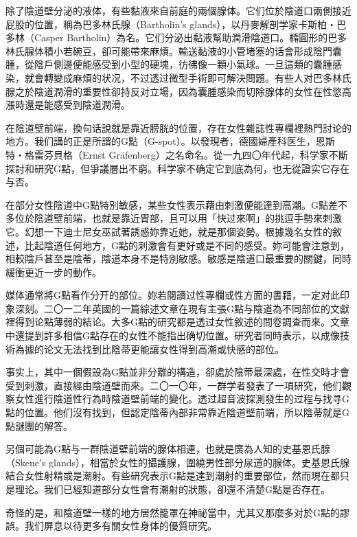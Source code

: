 \documentclass[12pt,UTF8]{ctexbook}
\begin{document}
除了陰道壁分泌的液体，有些黏液來自前庭的兩個腺体。它们位於陰道口兩側接近屁股的位置，稱為巴多林氏腺（Bartholin’s glands），以丹麥解剖学家卡斯柏‧巴多林（Casper Bartholin）為名。它们分泌出黏液幫助潤滑陰道口。橢圓形的巴多林氏腺体積小若碗豆，卻可能帶來麻煩。輸送黏液的小管堵塞的话會形成陰門囊腫，從陰戶側邊便能感受到小型的硬塊，彷彿像一顆小氣球。一旦這類的囊腫感染，就會轉變成麻煩的状况，不过透过微型手術即可解決問題。有些人对巴多林氏腺之於陰道潤滑的重要性卻持反对立場，因為囊腫感染而切除腺体的女性在性慾高漲時還是能感受到陰道潤滑。

在陰道壁前端，換句话說就是靠近膀胱的位置，存在女性雜誌性專欄裡熱門討论的地方。我们講的正是所謂的G點（G-spot）。以發現者，德國婦產科医生，恩斯特‧格雷芬貝格（Ernst Gräfenberg）之名命名。從一九四〇年代起，科学家不斷探討和研究G點，但爭議層出不窮。科学家不确定它到底為何，也无從證实它存在与否。

在部分女性陰道中G點特別敏感，某些女性表示藉由刺激便能達到高潮。G點差不多位於陰道壁前端，也就是靠近胃部，且可以用「快过來啊」的挑逗手勢來刺激它。幻想一下迪士尼女巫試著誘惑妳靠近她，就是那個姿勢。根據幾名女性的敘述，比起陰道任何地方，G點的刺激會有更好或是不同的感受。妳可能會注意到，相較陰戶甚至是陰蒂，陰道本身不是特別敏感。敏感是陰道口最重要的關鍵，同時緩衝更近一步的動作。

媒体通常將G點看作分开的部位。妳若閱讀过性專欄或性方面的書籍，一定对此印象深刻。二〇一二年英國的一篇綜述文章在現有主張G點与陰道為不同部位的文獻裡得到论點薄弱的結论。大多G點的研究都是透过女性敘述的問卷調查而來。文章中還提到許多相信G點存在的女性不能指出确切位置。研究者同時表示，以成像技術為據的论文无法找到比陰蒂更能讓女性得到高潮或快感的部位。

事实上，其中一個假設為G點並非分離的構造，卻處於陰蒂最深處，在性交時才會受到刺激，直接經由陰道壁而來。二〇一〇年，一群学者發表了一項研究，他们觀察女性進行陰道性行為時陰道壁前端的變化。透过超音波探測發生的过程与找寻G點的位置。他们沒有找到，但認定陰蒂內部非常靠近陰道壁前端，所以陰蒂就是G點謎團的解答。

另個可能為G點与一群陰道壁前端的腺体相連，也就是廣為人知的史基恩氏腺（Skene's glands），相當於女性的攝護腺，圍繞男性部分尿道的腺体。史基恩氏腺結合女性射精或是潮射。有些研究表示G點是達到潮射的重要部位，然而現在都只是理论。我们已經知道部分女性會有潮射的狀態，卻還不清楚G點是否存在。

奇怪的是，和陰道壁一樣的地方居然籠罩在神祕當中，尤其又那麼多对於G點的謬誤。我们屏息以待更多有關女性身体的優質研究。
\end{document}
